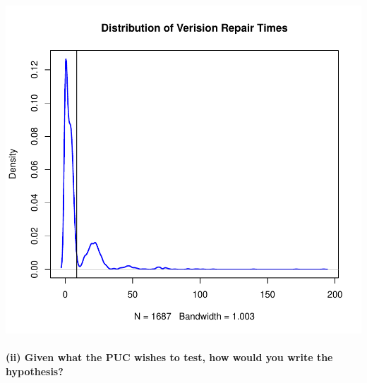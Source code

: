\documentclass[
]{article}
\newenvironment{Shaded}{\begin{snugshade}}{\end{snugshade}}
\newcommand{\AttributeTok}[1]{\textcolor[rgb]{0.13,0.29,0.53}{#1}}
\newcommand{\CommentTok}[1]{\textcolor[rgb]{0.56,0.35,0.01}{\textit{#1}}}
\newcommand{\DecValTok}[1]{\textcolor[rgb]{0.00,0.00,0.81}{#1}}
\newcommand{\FunctionTok}[1]{\textcolor[rgb]{0.13,0.29,0.53}{\textbf{#1}}}
\newcommand{\NormalTok}[1]{#1}
\newcommand{\OtherTok}[1]{\textcolor[rgb]{0.56,0.35,0.01}{#1}}
\newcommand{\SpecialCharTok}[1]{\textcolor[rgb]{0.81,0.36,0.00}{\textbf{#1}}}
\newcommand{\StringTok}[1]{\textcolor[rgb]{0.31,0.60,0.02}{#1}}
\begin{document}
\begin{Shaded}
\end{Shaded}

\includegraphics{bacs_hw4_files/figure-latex/unnamed-chunk-1-1.pdf}

\hypertarget{ii-given-what-the-puc-wishes-to-test-how-would-you-write-the-hypothesis}{%
\paragraph{(ii) Given what the PUC wishes to test, how would you write
the
hypothesis?}\label{ii-given-what-the-puc-wishes-to-test-how-would-you-write-the-hypothesis}}
\end{document}
